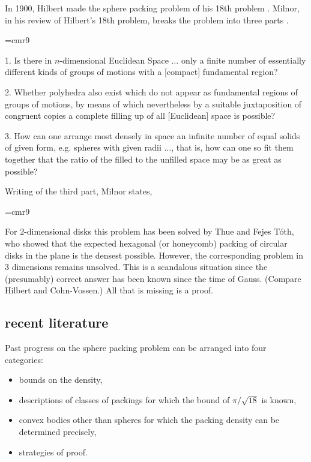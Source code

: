In 1900, Hilbert made the sphere packing problem of his 18th
problem \cite{hilbert}. Milnor, 
 in his review of Hilbert's 18th
problem, breaks the problem into three parts \cite{Mil76}.

{
\narrower
\font\ninerm=cmr9
\ninerm

1.  Is there in $n$-dimensional Euclidean Space $\ldots$ only a finite
number of essentially different kinds of groups of motions with a
[compact] fundamental region?

2.  Whether polyhedra also exist which do not appear as fundamental
    regions of groups of motions, by means of which nevertheless
    by a suitable juxtaposition of congruent copies a complete filling
    up of all [Euclidean] space is possible?

3.  How can one arrange most densely in space an infinite number
    of equal solids of given form, e.g. spheres with given radii $\ldots$,
    that is, how can one so fit them together that the ratio of the
    filled to the unfilled space may be as great as possible?

}

\smallskip
Writing of the third part, Milnor states,

{
\narrower
\font\ninerm=cmr9
\ninerm

For $2$-dimensional disks this problem has been solved by Thue and
Fejes T\'oth, who showed that the expected hexagonal (or honeycomb)
packing of circular disks in the plane is the densest possible.
However, the corresponding problem in $3$ dimensions remains
unsolved. This is a scandalous situation since the (presumably)
correct answer has been known since the time of Gauss. (Compare
Hilbert and Cohn-Vossen.)  All that is missing is a proof.
}

\subsection{recent literature}

Past progress on the sphere packing problem can be arranged into
four categories:
\begin{itemize}
    \item bounds on the density,
    \item descriptions of classes of packings for
which the bound of $\pi/\sqrt{18}$ is known,
    \item convex bodies other
than spheres for which the packing density can be determined
precisely,
    \item strategies of proof.
\end{itemize}

